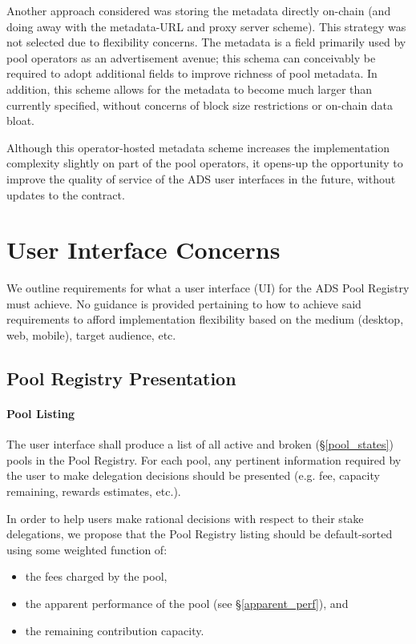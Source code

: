 Another approach considered was storing the metadata directly on-chain (and doing away with the metadata-URL and proxy server scheme). This strategy was not selected due to flexibility concerns. The metadata is a field primarily used by pool operators as an advertisement avenue; this schema can conceivably be required to adopt additional fields to improve richness of pool metadata. In addition, this scheme allows for the metadata to become much larger than currently specified, without concerns of block size restrictions or on-chain data bloat. 

Although this operator-hosted metadata scheme increases the implementation complexity slightly on part of the pool operators, it opens-up the opportunity to improve the quality of service of the ADS user interfaces in the future, without updates to the contract. 


\section{User Interface Concerns} \label{ads_ui}
We outline requirements for what a user interface (UI) for the ADS Pool Registry must achieve. No guidance is provided pertaining to how to achieve said requirements to afford implementation flexibility based on the medium (desktop, web, mobile), target audience, etc. 

\subsection{Pool Registry Presentation} \label{registry_presentation}

\paragraph*{Pool Listing} The user interface shall produce a list of all active and broken (\S\ref{pool_states}) pools in the Pool Registry. For each pool, any pertinent information required by the user to make delegation decisions should be presented (e.g. fee, capacity remaining, rewards estimates, etc.). 

In order to help users make rational decisions with respect to their stake delegations, we propose that the Pool Registry listing should be default-sorted using some weighted function of:

\begin{itemize}[label=--,nosep]
    \item the fees charged by the pool, 
    \item the apparent performance of the pool (see \S\ref{apparent_perf}), and
    \item the remaining contribution capacity.
\end{itemize}

